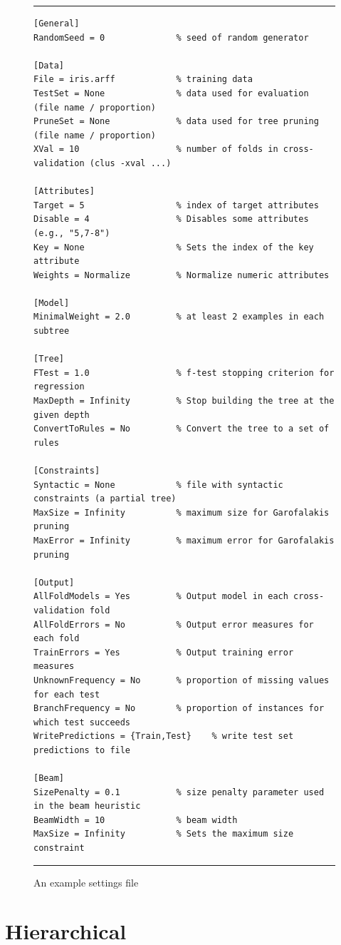 \documentclass[a4paper]{report}
\begin{document}
\begin{figure}
\hrule
\begin{verbatim}
[General]
RandomSeed = 0              % seed of random generator

[Data]
File = iris.arff            % training data
TestSet = None              % data used for evaluation (file name / proportion)
PruneSet = None             % data used for tree pruning (file name / proportion)
XVal = 10                   % number of folds in cross-validation (clus -xval ...)

[Attributes]
Target = 5                  % index of target attributes
Disable = 4                 % Disables some attributes (e.g., "5,7-8")
Key = None                  % Sets the index of the key attribute
Weights = Normalize         % Normalize numeric attributes

[Model]
MinimalWeight = 2.0         % at least 2 examples in each subtree
         
[Tree]
FTest = 1.0                 % f-test stopping criterion for regression
MaxDepth = Infinity         % Stop building the tree at the given depth
ConvertToRules = No         % Convert the tree to a set of rules

[Constraints]
Syntactic = None            % file with syntactic constraints (a partial tree)
MaxSize = Infinity          % maximum size for Garofalakis pruning
MaxError = Infinity         % maximum error for Garofalakis pruning

[Output]
AllFoldModels = Yes         % Output model in each cross-validation fold
AllFoldErrors = No          % Output error measures for each fold
TrainErrors = Yes           % Output training error measures
UnknownFrequency = No       % proportion of missing values for each test
BranchFrequency = No        % proportion of instances for which test succeeds
WritePredictions = {Train,Test}    % write test set predictions to file

[Beam]
SizePenalty = 0.1           % size penalty parameter used in the beam heuristic
BeamWidth = 10              % beam width
MaxSize = Infinity          % Sets the maximum size constraint
\end{verbatim}
\hrule
\caption{An example settings file}
\label{settings:fig}
\end{figure}


\section{Hierarchical}
\end{document}

